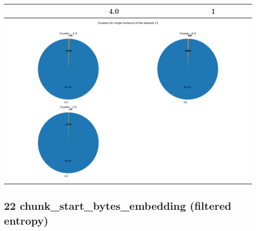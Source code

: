 \begin{longtable}{|c|c|c|c|c|}
& \multicolumn{2}{c|}{4.0} & \multicolumn{2}{c|}{1} \\
\hline
\multicolumn{5}{|c|}{\includegraphics[width=0.8\linewidth]{img/annexes/21/clustering_pie_charts/single instance.png}} \\
\end{longtable}


\subsection{22 chunk\_start\_bytes\_embedding (filtered entropy)}

